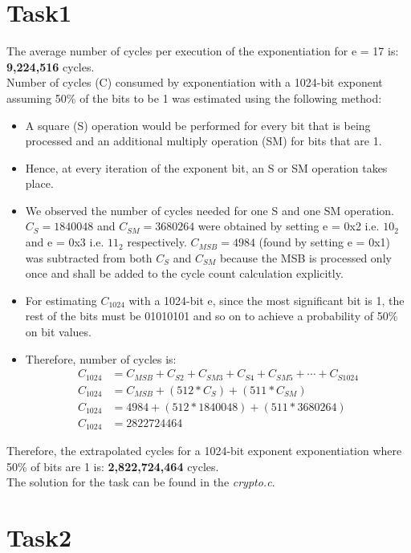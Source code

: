 \documentclass[1p,16pt]{elsarticle}
\begin{document}
\section{Task1}
The average number of cycles per execution of the exponentiation for e = 17 is:
\textbf{9,224,516} cycles.
\\
Number of cycles (C) consumed by exponentiation with a 1024-bit exponent assuming 50\% of the bits to be 1 was estimated using the following method:
\begin{itemize}
	\item A square (S) operation would be performed for every bit that is being processed and an additional multiply operation (SM) for bits that are 1.
	\item Hence, at every iteration of the exponent bit, an S or SM operation takes place.
	\item We observed the number of cycles needed for one S and one SM operation. $C_S = 1840048$ and $C_{SM} = 3680264$
		were obtained by setting e = 0x2  i.e. $10_2$ and e = 0x3  i.e. $11_2$ respectively.
		$C_{MSB} = 4984$ (found by setting e = 0x1) was subtracted from both $C_S$ and $C_{SM}$ because
		the MSB is processed only once and shall be added to the cycle count calculation explicitly.
	\item For estimating $C_{1024}$ with a 1024-bit e, since the most significant bit is 1, the rest of the bits
		must be 01010101 and so on to achieve a probability of 50\% on bit values.
	\item Therefore, number of cycles is: \\
		\begin{align}
			C_{1024} &= C_{MSB} + C_{S2} + C_{SM3} + C_{S4} + C_{SM5} + \cdots + C_{S1024} \\
			C_{1024} &= C_{MSB} + (512 * C_S) + (511 * C_{SM}) \\
			C_{1024} &= 4984 + (512 * 1840048) + (511 * 3680264) \\
			C_{1024} &= 2822724464
		\end{align}
\end{itemize}

Therefore, the extrapolated cycles for a 1024-bit exponent exponentiation where 50\% of bits are 1 is:
\textbf{2,822,724,464} cycles.
\\
The solution for the task can be found in the \textit{crypto.c}.
\section{Task2}
\end{document}
